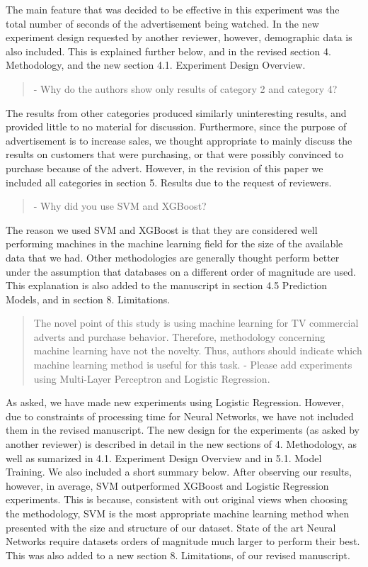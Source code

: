 \documentclass[review]{elsarticle}
\begin{document}
The main feature that was decided to be effective in this experiment was the total number of seconds of the advertisement being watched. In the new experiment design requested by another reviewer, however, demographic data is also included. This is explained further below, and in the revised section 4. Methodology,  and the new section 4.1. Experiment Design Overview.

\begin{quotation}
- Why do the authors show only results of category 2 and category 4?
\end{quotation}

The results from other categories produced similarly uninteresting results, and provided little to no material for discussion. Furthermore, since the purpose of advertisement is to increase sales, we thought appropriate to mainly discuss the results on customers that were purchasing, or that were possibly convinced to purchase because of the advert. However, in the revision of this paper we included all categories in section 5. Results due to the request of reviewers.

\begin{quotation}
- Why did you use SVM and XGBoost?
\end{quotation}

The reason we used SVM and XGBoost is that they are considered well performing machines in the machine learning field for the size of the available data that we had. Other methodologies are generally thought perform better under the assumption that databases on a different order of magnitude are used. This explanation is also added to the manuscript in section 4.5 Prediction Models, and in section 8. Limitations. 

\begin{quotation}
The novel point of this study is using machine learning for TV commercial adverts and purchase behavior.
Therefore, methodology concerning machine learning have not the novelty.
Thus, authors should indicate which machine learning method is useful for this task.
- Please add experiments using Multi-Layer Perceptron and Logistic Regression.
\end{quotation}

As asked, we have made new experiments using Logistic Regression. However, due to constraints of processing time for Neural Networks, we have not included them in the revised manuscript. The new design for the experiments (as asked by another reviewer) is described in detail in the new sections of 4. Methodology, as well as sumarized in 4.1. Experiment Design Overview and in 5.1. Model Training. We also included a short summary below. After observing our results, however, in average, SVM outperformed XGBoost and Logistic Regression experiments. This is because, consistent with out original views when choosing the methodology, SVM is the most appropriate machine learning method when presented with the size and structure of our dataset. State of the art Neural Networks require datasets orders of magnitude much larger to perform their best. This was also added to a new section 8. Limitations, of our revised manuscript.
\end{document}
